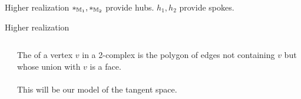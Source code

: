 \documentclass[14pt,aspectratio=169]{beamer}
\begin{document}
\begin{frame}{Higher realization}
\( *_{\mathbb{M}_1}, *_{\mathbb{M}_2} \) provide \alert{hubs}. \( h_1, h_2 \) provide \alert{spokes}.
\[\]
\end{frame}


\begin{frame}{Higher realization}
\begin{columns}
\begin{column}{0.5\textwidth}

\end{column}
\begin{column}{0.5\textwidth}
The  of a vertex \( v \) in a 2-complex is the polygon of edges not containing \( v \) but whose union with \( v \) is a face.\\~\\

This will be our model of the tangent space.
\end{column}
\end{columns}
\end{frame}
\end{document}
